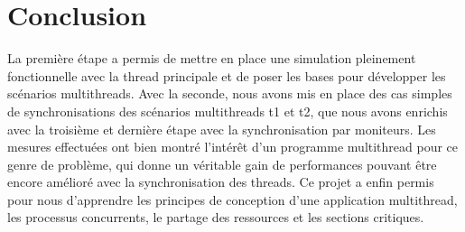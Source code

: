\documentclass[11pt]{article} %
\begin{document}
\section{Conclusion}
La première étape a permis de mettre en place une simulation pleinement fonctionnelle avec la thread principale et de poser les bases pour développer les scénarios multithreads. Avec la seconde, nous avons mis en place des cas simples de synchronisations des scénarios multithreads t1 et t2, que nous avons enrichis avec la troisième et dernière étape avec la synchronisation par moniteurs.
Les mesures effectuées ont bien montré l'intérêt d'un programme multithread pour ce genre de problème, qui donne un véritable gain de performances pouvant être encore amélioré avec la synchronisation des threads.
Ce projet a enfin permis pour nous d'apprendre les principes de conception d'une application multithread, les processus concurrents, le partage des ressources et les sections critiques.
\end{document}
